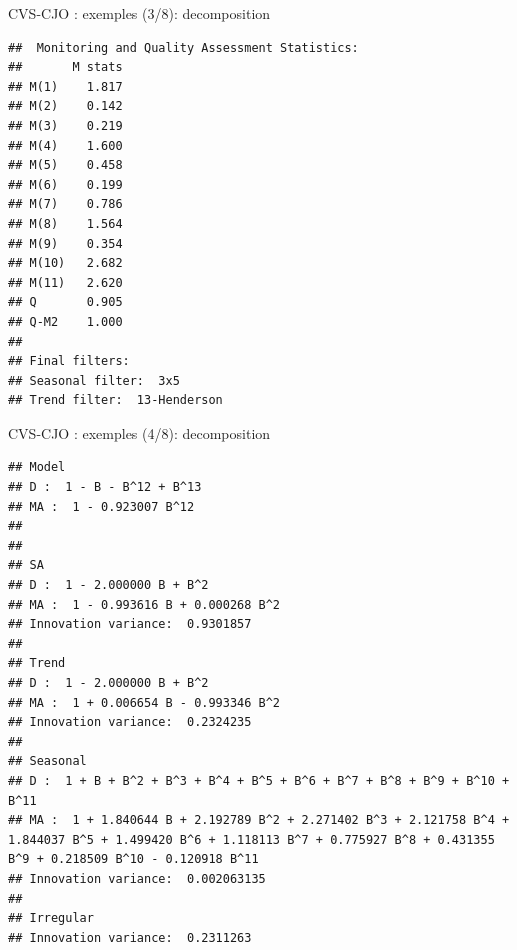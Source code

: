 \documentclass[10pt,xcolor=table,color={dvipsnames,usenames},ignorenonframetext,usepdftitle=false,french]{beamer}
\newenvironment{Shaded}{\begin{snugshade}}{\end{snugshade}}
\newcommand{\NormalTok}[1]{#1}
\newcommand{\OperatorTok}[1]{\textcolor[rgb]{0.81,0.36,0.00}{\textbf{#1}}}
\begin{document}
\begin{frame}[fragile]{CVS-CJO : exemples (3/8): decomposition}
\protect\hypertarget{cvs-cjo-exemples-38-decomposition}{}

\footnotesize

\begin{Shaded}
\end{Shaded}

\begin{verbatim}
##  Monitoring and Quality Assessment Statistics:  
##       M stats
## M(1)    1.817
## M(2)    0.142
## M(3)    0.219
## M(4)    1.600
## M(5)    0.458
## M(6)    0.199
## M(7)    0.786
## M(8)    1.564
## M(9)    0.354
## M(10)   2.682
## M(11)   2.620
## Q       0.905
## Q-M2    1.000
## 
## Final filters: 
## Seasonal filter:  3x5
## Trend filter:  13-Henderson
\end{verbatim}

\end{frame}

\begin{frame}[fragile]{CVS-CJO : exemples (4/8): decomposition}
\protect\hypertarget{cvs-cjo-exemples-48-decomposition}{}

\footnotesize

\begin{Shaded}
\end{Shaded}

\begin{verbatim}
## Model
## D :  1 - B - B^12 + B^13 
## MA :  1 - 0.923007 B^12 
## 
## 
## SA
## D :  1 - 2.000000 B + B^2 
## MA :  1 - 0.993616 B + 0.000268 B^2 
## Innovation variance:  0.9301857 
## 
## Trend
## D :  1 - 2.000000 B + B^2 
## MA :  1 + 0.006654 B - 0.993346 B^2 
## Innovation variance:  0.2324235 
## 
## Seasonal
## D :  1 + B + B^2 + B^3 + B^4 + B^5 + B^6 + B^7 + B^8 + B^9 + B^10 + B^11 
## MA :  1 + 1.840644 B + 2.192789 B^2 + 2.271402 B^3 + 2.121758 B^4 + 1.844037 B^5 + 1.499420 B^6 + 1.118113 B^7 + 0.775927 B^8 + 0.431355 B^9 + 0.218509 B^10 - 0.120918 B^11 
## Innovation variance:  0.002063135 
## 
## Irregular
## Innovation variance:  0.2311263
\end{verbatim}

\end{frame}
\end{document}
